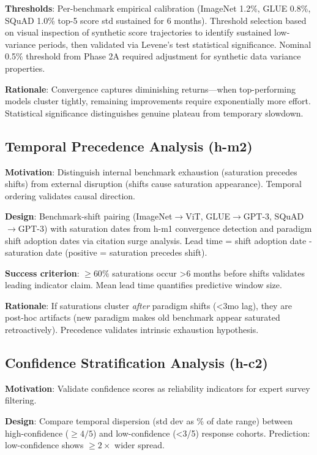\textbf{Thresholds}: Per-benchmark empirical calibration (ImageNet 1.2\%, GLUE 0.8\%, SQuAD 1.0\% top-5 score std sustained for 6 months). Threshold selection based on visual inspection of synthetic score trajectories to identify sustained low-variance periods, then validated via Levene's test statistical significance. Nominal 0.5\% threshold from Phase 2A required adjustment for synthetic data variance properties.

\textbf{Rationale}: Convergence captures diminishing returns---when top-performing models cluster tightly, remaining improvements require exponentially more effort. Statistical significance distinguishes genuine plateau from temporary slowdown.

\subsection{Temporal Precedence Analysis (h-m2)}

\textbf{Motivation}: Distinguish internal benchmark exhaustion (saturation precedes shifts) from external disruption (shifts cause saturation appearance). Temporal ordering validates causal direction.

\textbf{Design}: Benchmark-shift pairing (ImageNet$\rightarrow$ViT, GLUE$\rightarrow$GPT-3, SQuAD$\rightarrow$GPT-3) with saturation dates from h-m1 convergence detection and paradigm shift adoption dates via citation surge analysis. Lead time = shift adoption date - saturation date (positive = saturation precedes shift).

\textbf{Success criterion}: $\geq 60\%$ saturations occur >6 months before shifts validates leading indicator claim. Mean lead time quantifies predictive window size.

\textbf{Rationale}: If saturations cluster \emph{after} paradigm shifts (<3mo lag), they are post-hoc artifacts (new paradigm makes old benchmark appear saturated retroactively). Precedence validates intrinsic exhaustion hypothesis.

\subsection{Confidence Stratification Analysis (h-c2)}

\textbf{Motivation}: Validate confidence scores as reliability indicators for expert survey filtering.

\textbf{Design}: Compare temporal dispersion (std dev as \% of date range) between high-confidence ($\geq 4/5$) and low-confidence (<3/5) response cohorts. Prediction: low-confidence shows $\geq 2\times$ wider spread.

